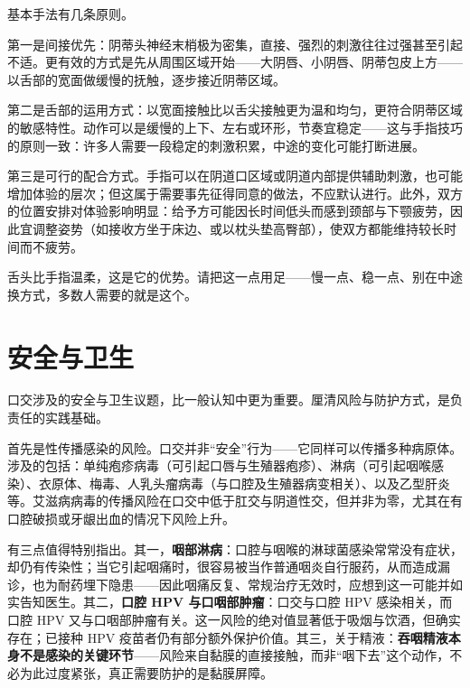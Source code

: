 \documentclass[12pt,UTF8]{ctexbook}
\newcommand{\keyword}[1]{\textbf{#1}}
\begin{document}
基本手法有几条原则。

第一是间接优先：阴蒂头神经末梢极为密集，直接、强烈的刺激往往过强甚至引起不适。更有效的方式是先从周围区域开始——大阴唇、小阴唇、阴蒂包皮上方——以舌部的宽面做缓慢的抚触，逐步接近阴蒂区域。

第二是舌部的运用方式：以宽面接触比以舌尖接触更为温和均匀，更符合阴蒂区域的敏感特性。动作可以是缓慢的上下、左右或环形，节奏宜稳定——这与手指技巧的原则一致：许多人需要一段稳定的刺激积累，中途的变化可能打断进展。

第三是可行的配合方式。手指可以在阴道口区域或阴道内部提供辅助刺激，也可能增加体验的层次；但这属于需要事先征得同意的做法，不应默认进行。此外，双方的位置安排对体验影响明显：给予方可能因长时间低头而感到颈部与下颚疲劳，因此宜调整姿势（如接收方坐于床边、或以枕头垫高臀部），使双方都能维持较长时间而不疲劳。

\begin{tcolorbox}[colback=pink!5!white,colframe=red!50!black,title=贴心小叮咛]
舌头比手指温柔，这是它的优势。请把这一点用足——慢一点、稳一点、别在中途换方式，多数人需要的就是这个。
\end{tcolorbox}

\section{安全与卫生}

口交涉及的安全与卫生议题，比一般认知中更为重要。厘清风险与防护方式，是负责任的实践基础。

首先是性传播感染的风险。口交并非“安全”行为——它同样可以传播多种病原体。涉及的包括：单纯疱疹病毒（可引起口唇与生殖器疱疹）、淋病（可引起咽喉感染）、衣原体、梅毒、人乳头瘤病毒（与口腔及生殖器病变相关）、以及乙型肝炎等。艾滋病病毒的传播风险在口交中低于肛交与阴道性交，但并非为零，尤其在有口腔破损或牙龈出血的情况下风险上升。

有三点值得特别指出。其一，\keyword{咽部淋病}：口腔与咽喉的淋球菌感染常常没有症状，却仍有传染性；当它引起咽痛时，很容易被当作普通咽炎自行服药，从而造成漏诊，也为耐药埋下隐患——因此咽痛反复、常规治疗无效时，应想到这一可能并如实告知医生。其二，\keyword{口腔 HPV 与口咽部肿瘤}：口交与口腔 HPV 感染相关，而口腔 HPV 又与口咽部肿瘤有关。这一风险的绝对值显著低于吸烟与饮酒，但确实存在；已接种 HPV 疫苗者仍有部分额外保护价值。其三，关于精液：\keyword{吞咽精液本身不是感染的关键环节}——风险来自黏膜的直接接触，而非“咽下去”这个动作，不必为此过度紧张，真正需要防护的是黏膜屏障。
\end{document}
